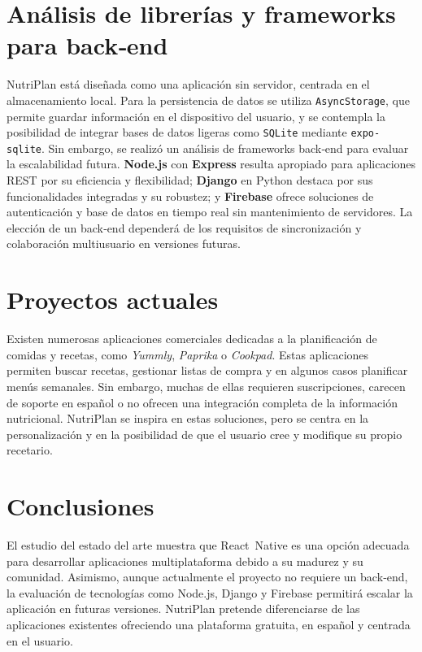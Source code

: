 \documentclass[twoside, openright, 11pt]{report}
\begin{document}
\section{Análisis de librerías y frameworks para back‑end}
NutriPlan está diseñada como una aplicación sin servidor, centrada en el almacenamiento local. Para la persistencia de datos se utiliza \verb|AsyncStorage|, que permite guardar información en el dispositivo del usuario, y se contempla la posibilidad de integrar bases de datos ligeras como \verb|SQLite| mediante \verb|expo-sqlite|. Sin embargo, se realizó un análisis de frameworks back‑end para evaluar la escalabilidad futura. \textbf{Node.js} con \textbf{Express} resulta apropiado para aplicaciones REST por su eficiencia y flexibilidad; \textbf{Django} en Python destaca por sus funcionalidades integradas y su robustez; y \textbf{Firebase} ofrece soluciones de autenticación y base de datos en tiempo real sin mantenimiento de servidores. La elección de un back‑end dependerá de los requisitos de sincronización y colaboración multiusuario en versiones futuras.

\section{Proyectos actuales}
Existen numerosas aplicaciones comerciales dedicadas a la planificación de comidas y recetas, como \textit{Yummly}, \textit{Paprika} o \textit{Cookpad}. Estas aplicaciones permiten buscar recetas, gestionar listas de compra y en algunos casos planificar menús semanales. Sin embargo, muchas de ellas requieren suscripciones, carecen de soporte en español o no ofrecen una integración completa de la información nutricional. NutriPlan se inspira en estas soluciones, pero se centra en la personalización y en la posibilidad de que el usuario cree y modifique su propio recetario.

\section{Conclusiones}
El estudio del estado del arte muestra que React Native es una opción adecuada para desarrollar aplicaciones multiplataforma debido a su madurez y su comunidad. Asimismo, aunque actualmente el proyecto no requiere un back‑end, la evaluación de tecnologías como Node.js, Django y Firebase permitirá escalar la aplicación en futuras versiones. NutriPlan pretende diferenciarse de las aplicaciones existentes ofreciendo una plataforma gratuita, en español y centrada en el usuario.
\end{document}
